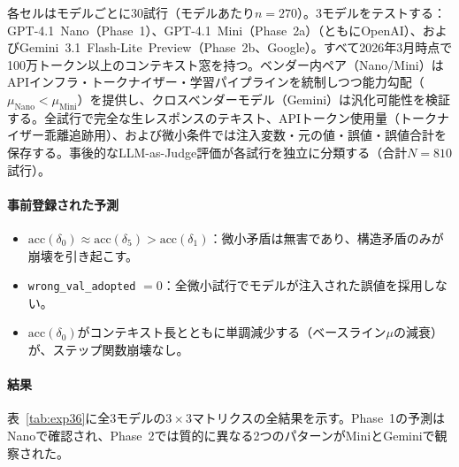 \documentclass[11pt,a4paper]{article}
\begin{document}
各セルはモデルごとに30試行（モデルあたり$n = 270$）。3モデルをテストする：GPT-4.1~Nano（Phase~1）、GPT-4.1~Mini（Phase~2a）（ともにOpenAI）、およびGemini~3.1~Flash-Lite~Preview（Phase~2b、Google）。すべて2026年3月時点で100万トークン以上のコンテキスト窓を持つ。ベンダー内ペア（Nano/Mini）はAPIインフラ・トークナイザー・学習パイプラインを統制しつつ能力勾配（$\mu_{\text{Nano}} < \mu_{\text{Mini}}$）を提供し、クロスベンダーモデル（Gemini）は汎化可能性を検証する。全試行で完全な生レスポンスのテキスト、APIトークン使用量（トークナイザー乖離追跡用）、および微小条件では注入変数・元の値・誤値・誤値合計を保存する。事後的なLLM-as-Judge評価が各試行を独立に分類する（合計$N = 810$試行）。

\paragraph{事前登録された予測}
\begin{itemize}
  \item[\textbf{P\textsubscript{1}}] $\text{acc}(\delta_0) \approx \text{acc}(\delta_5) > \text{acc}(\delta_1)$：微小矛盾は無害であり、構造矛盾のみが崩壊を引き起こす。
  \item[\textbf{P\textsubscript{2}}] \texttt{wrong\_val\_adopted} $= 0$：全微小試行でモデルが注入された誤値を採用しない。
  \item[\textbf{P\textsubscript{3}}] $\text{acc}(\delta_0)$がコンテキスト長とともに単調減少する（ベースライン$\mu$の減衰）が、ステップ関数崩壊なし。
\end{itemize}

\paragraph{結果}
表~\ref{tab:exp36}に全3モデルの$3 \times 3$マトリクスの全結果を示す。Phase~1の予測はNanoで確認され、Phase~2では質的に異なる2つのパターンがMiniとGeminiで観察された。
\end{document}

